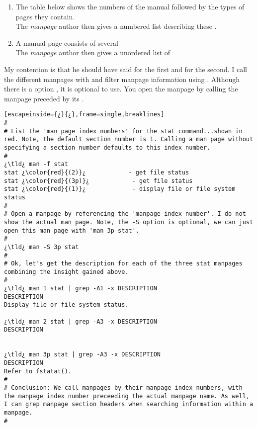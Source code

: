 \begin{enumerate}
	\item{The table below shows the  numbers of the manual followed by the types of pages they contain.}\\
	The  \emph{manpage} author then gives a numbered list describing these .
	\item{A manual page consists of several }\\
	The  \emph{manpage} author then gives a unordered list of 
\end{enumerate}

My contention is that he should have said  for the first and  for the second. I call the different manpages with  and filter manpage information using . Although there is a  option , it is optional to use. You open the manpage by calling the manpage preceded by its .

\begin{lstlisting}[escapeinside={¿}{¿},frame=single,breaklines]
#
# List the 'man page index numbers' for the stat command...shown in red. Note, the default section number is 1. Calling a man page without specifying a section number defaults to this index number.
#
¿\tld¿ man -f stat
stat ¿\color{red}{(2)}¿            - get file status
stat ¿\color{red}{(3p)}¿            - get file status
stat ¿\color{red}{(1)}¿             - display file or file system status
#
# Open a manpage by referencing the 'manpage index number'. I do not show the actual man page. Note, the -S option is optional, we can just open this man page with 'man 3p stat'.
#
¿\tld¿ man -S 3p stat
#
# Ok, let's get the description for each of the three stat manpages combining the insight gained above.
#
¿\tld¿ man 1 stat | grep -A1 -x DESCRIPTION
DESCRIPTION
Display file or file system status.

¿\tld¿ man 2 stat | grep -A3 -x DESCRIPTION
DESCRIPTION


¿\tld¿ man 3p stat | grep -A3 -x DESCRIPTION
DESCRIPTION
Refer to fstatat().
#
# Conclusion: We call manpages by their manpage index numbers, with the manpage index number preceeding the actual manpage name. As well, I can grep manpage section headers when searching information within a manpage.
#
\end{lstlisting}

